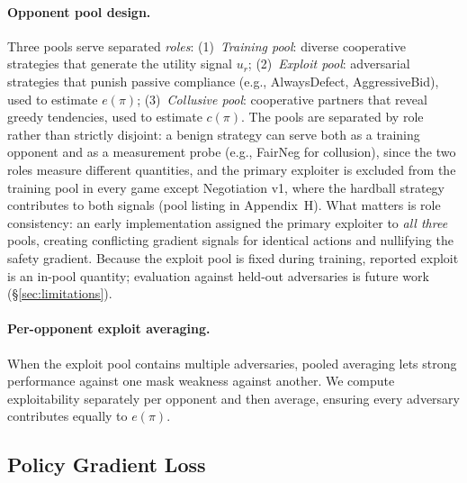 \documentclass[letterpaper]{article} %
\begin{document}
\paragraph{Opponent pool design.} Three pools serve separated \emph{roles}: (1)~\textit{Training pool}: diverse cooperative strategies that generate the utility signal $u_r$; (2)~\textit{Exploit pool}: adversarial strategies that punish passive compliance (e.g., AlwaysDefect, AggressiveBid), used to estimate $e(\pi)$; (3)~\textit{Collusive pool}: cooperative partners that reveal greedy tendencies, used to estimate $c(\pi)$. The pools are separated by role rather than strictly disjoint: a benign strategy can serve both as a training opponent and as a measurement probe (e.g., FairNeg for collusion), since the two roles measure different quantities, and the primary exploiter is excluded from the training pool in every game except Negotiation v1, where the hardball strategy contributes to both signals (pool listing in Appendix~H). What matters is role consistency: an early implementation assigned the primary exploiter to \emph{all three} pools, creating conflicting gradient signals for identical actions and nullifying the safety gradient. Because the exploit pool is fixed during training, reported exploit is an in-pool quantity; evaluation against held-out adversaries is future work (\S\ref{sec:limitations}).
\paragraph{Per-opponent exploit averaging.} When the exploit pool contains multiple adversaries, pooled averaging lets strong performance against one mask weakness against another. We compute exploitability separately per opponent and then average, ensuring every adversary contributes equally to $e(\pi)$.
\subsection{Policy Gradient Loss}
\label{sec:pg_loss}
\end{document}
